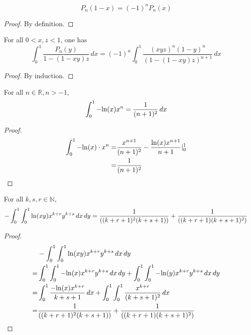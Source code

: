 \begin{lemma}\label{shiftedLegendre_eval_symm}
    \[ P_n(1-x)=(-1)^nP_n(x) \]
\end{lemma}
\begin{proof}
    \leanok
    By definition.
\end{proof}

\begin{lemma}\label{Legendre_poly_mul_frac_integral}
    For all $ 0 < x, z < 1$, one has
    \[ \int_{0}^{1}\frac{P_n(y)}{1 - (1-xy)z} \, dx =(-1)^n \int_{0}^{1} \frac{(xyz)^n(1-y)^n}{(1 - (1-xy)z)^{n+1}} \, dx \]
\end{lemma}
\begin{proof}
    \leanok
    By induction.
\end{proof}



\begin{lemma}\label{log_pow_integral}
    For all $n \in \mathbb{R}, n > -1$,
    \[ \int_{0}^{1} -{\rm ln}(x) x^n = \frac{1}{(n + 1)^2} \, dx \]
\end{lemma}
\begin{proof}
    \leanok
    \begin{align*}
        \int_{0}^{1} -{\rm ln}(x)\cdot x^n =& \frac{x^{n+1}}{(n+1)^2} - \frac{{\rm ln}(x) x^{n+1}}{n+1} |_0^1 \\
        =& \frac{1}{(n+1)^2}
    \end{align*}
\end{proof}

\begin{lemma}\label{J_rs_eq_sum_aux}
    For all $k,s,r \in \mathbb{N}$,
    \[-\int_{0}^{1}\int_{0}^{1} {\rm ln}(xy)x^{k+r}y^{k+s}\, dx \, dy = \frac{1}{((k+r+1)^2(k+s+1))}+\frac{1}{((k+r+1)(k+s+1)^2)}\]
\end{lemma}
\begin{proof}
    \leanok
    \begin{align*}
         &-\int_{0}^{1}\int_{0}^{1} {\rm ln}(xy)x^{k+r}y^{k+s}\, dx \, dy \\
        =& \int_{0}^{1}\int_{0}^{1} -{\rm ln}(x)x^{k+r}y^{k+s}\, dx \, dy + \int_{0}^{1}\int_{0}^{1} -{\rm ln}(y)x^{k+r}y^{k+s}\, dx \, dy \\
        =& \int_{0}^{1} \frac{-{\rm ln}(x)x^{k+r}}{k+s+1} \, dx + \int_{0}^{1}\int_{0}^{1} \frac{x^{k+r}}{(k+s+1)^2}\, dx\\
        =& \frac{1}{((k+r+1)^2(k+s+1))} + \frac{1}{((k+r+1)(k+s+1)^2)}
    \end{align*}
\end{proof}

